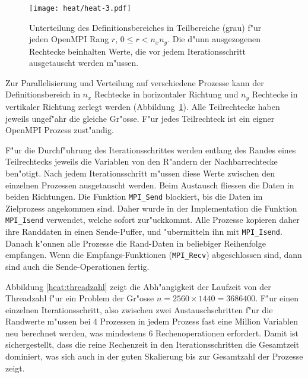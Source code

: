 \begin{figure}
\begin{center}
\texttt{[image: heat/heat-3.pdf]}
\end{center}
\caption{Unterteilung des Definitionsbereiches in Teilbereiche (grau)
f"ur jeden OpenMPI Rang $r$, $0\le r<n_xn_y$.
Die d"unn ausgezogenen Rechtecke beinhalten Werte, die vor jedem 
Iterationsschritt ausgetauscht werden m"ussen.
\label{heat:domainpartition}}
\end{figure}

Zur Parallelisierung und Verteilung auf verschiedene Prozesse kann
der Definitionsbereich in $n_x$ Rechtecke in horizontaler Richtung
und $n_y$ Rechtecke in vertikaler Richtung zerlegt werden
(Abbildung~\ref{heat:domainpartition}).
Alle Teilrechtecke haben jeweils ungef"ahr die gleiche Gr"osse.
F"ur jedes Teilrechteck ist ein eigner OpenMPI Prozess zust"andig.

F"ur die Durchf"uhrung des Iterationsschrittes werden entlang des Randes
eines Teilrechtecks jeweils
die Variablen von den R"andern der Nachbarrechtecke ben"otigt.
Nach jedem Iterationsschritt m"ussen diese Werte zwischen den einzelnen
Prozessen ausgetauscht werden.
Beim Austausch fliessen die Daten in beiden Richtungen. Die Funktion
\verb+MPI_Send+ blockiert, bis die Daten im Zielprozess angekommen sind.
Daher wurde in der Implementation die Funktion \verb+MPI_Isend+ verwendet,
welche sofort zur"uckkommt. Alle Prozesse kopieren daher ihre Randdaten in
einen Sende-Puffer, und "ubermitteln ihn mit \verb+MPI_Isend+.
Danach k"onnen alle Prozesse die Rand-Daten in beliebiger Reihenfolge
empfangen. Wenn die Empfangs-Funktionen (\verb+MPI_Recv+) abgeschlossen sind,
dann sind auch die Sende-Operationen fertig.

Abbildung \ref{heat:threadzahl} zeigt die Abh"angigkeit der Laufzeit von der
Threadzahl f"ur ein Problem der Gr"osse $n=2560 \times 1440=3686400$.
F"ur einen einzelnen Iterationsschritt, also zwischen zwei Austauschschritten
f"ur die Randwerte m"ussen bei 4 Prozessen in jedem Prozess fast eine Million
Variablen neu berechnet werden, was mindestens 6 Rechenoperationen erfordert.
Damit ist sichergestellt, dass die reine Rechenzeit in den Iterationsschritten
die Gesamtzeit dominiert, was sich auch in der guten Skalierung bis
zur Gesamtzahl der Prozesse zeigt.

